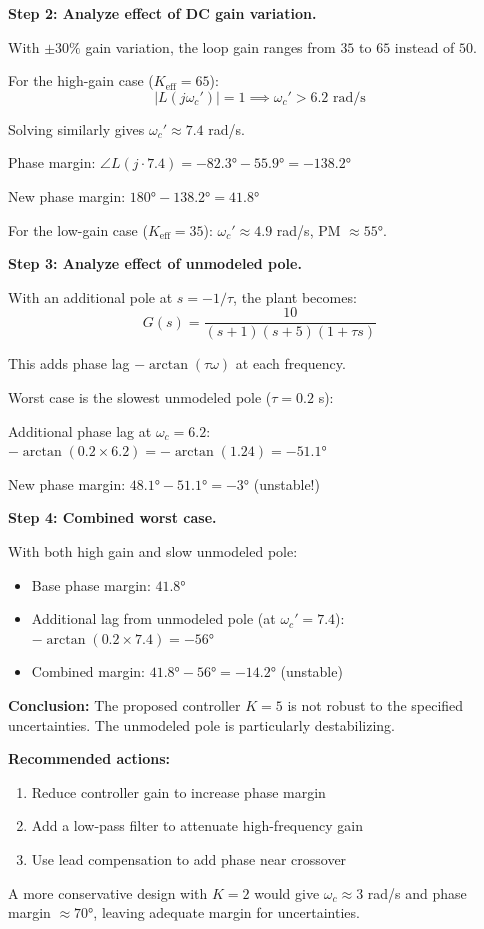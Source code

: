 \begin{example}
\textbf{Step 2: Analyze effect of DC gain variation.}

With $\pm 30\%$ gain variation, the loop gain ranges from $35$ to $65$ instead of $50$.

For the high-gain case ($K_{\text{eff}} = 65$):
\begin{equation}
|L(j\omega_c')| = 1 \implies \omega_c' > 6.2 \text{ rad/s}
\end{equation}

Solving similarly gives $\omega_c' \approx 7.4$ rad/s.

Phase margin: $\angle L(j\cdot 7.4) = -82.3° - 55.9° = -138.2°$

New phase margin: $180° - 138.2° = 41.8°$

For the low-gain case ($K_{\text{eff}} = 35$): $\omega_c' \approx 4.9$ rad/s, PM $\approx 55°$.

\textbf{Step 3: Analyze effect of unmodeled pole.}

With an additional pole at $s = -1/\tau$, the plant becomes:
\begin{equation}
G(s) = \frac{10}{(s+1)(s+5)(1+\tau s)}
\end{equation}

This adds phase lag $-\arctan(\tau\omega)$ at each frequency.

Worst case is the slowest unmodeled pole ($\tau = 0.2$ s):

Additional phase lag at $\omega_c = 6.2$: $-\arctan(0.2 \times 6.2) = -\arctan(1.24) = -51.1°$

New phase margin: $48.1° - 51.1° = -3°$ (unstable!)

\textbf{Step 4: Combined worst case.}

With both high gain and slow unmodeled pole:
\begin{itemize}
    \item Base phase margin: $41.8°$
    \item Additional lag from unmodeled pole (at $\omega_c' = 7.4$): $-\arctan(0.2 \times 7.4) = -56°$
    \item Combined margin: $41.8° - 56° = -14.2°$ (unstable)
\end{itemize}

\textbf{Conclusion:} The proposed controller $K = 5$ is not robust to the specified uncertainties. The unmodeled pole is particularly destabilizing.

\textbf{Recommended actions:}
\begin{enumerate}
    \item Reduce controller gain to increase phase margin
    \item Add a low-pass filter to attenuate high-frequency gain
    \item Use lead compensation to add phase near crossover
\end{enumerate}

A more conservative design with $K = 2$ would give $\omega_c \approx 3$ rad/s and phase margin $\approx 70°$, leaving adequate margin for uncertainties.
\end{example}

